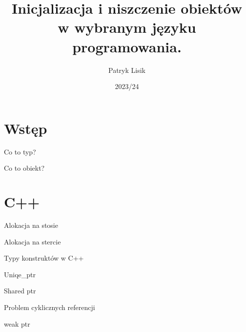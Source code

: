 \documentclass[xcolor=table]{beamer}
\title[Cykl życia obiektów]{Inicjalizacja i niszczenie obiektów w wybranym języku programowania.} %
\author{Patryk Lisik} %
\institute[] %
{
Uniwersytet Łódzki \\ %
}
\date{2023/24} %
\begin{document}
\begin{frame}
\titlepage
\end{frame}

\section{Wstęp}

\begin{frame}{Co to typ?}

\end{frame}


\begin{frame}{Co to obiekt?}
    
\end{frame}

\section{C++}

\begin{frame}{Alokacja na stosie}
    
\end{frame}

\begin{frame}{Alokacja na stercie}
    
\end{frame}


\begin{frame}{Typy konstruktów w C++}
    
\end{frame}


\begin{frame}{Uniqe\_ptr}
    
\end{frame}

\begin{frame}{Shared ptr}
    
\end{frame}

\begin{frame}{Problem cyklicznych referencji}
    
\end{frame}

\begin{frame}{weak ptr}

\end{frame}
\end{document}
